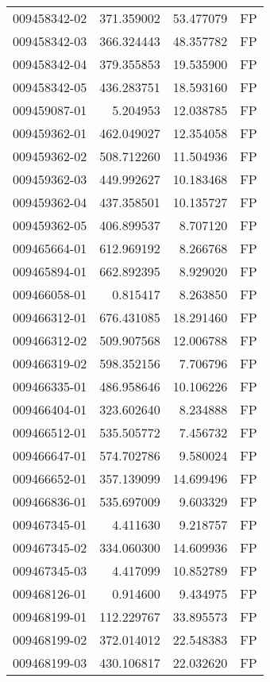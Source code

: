 \begin{tabular}{lrrl}
009458342-02 &  371.359002 &    53.477079 &   FP \\
009458342-03 &  366.324443 &    48.357782 &   FP \\
009458342-04 &  379.355853 &    19.535900 &   FP \\
009458342-05 &  436.283751 &    18.593160 &   FP \\
009459087-01 &    5.204953 &    12.038785 &   FP \\
009459362-01 &  462.049027 &    12.354058 &   FP \\
009459362-02 &  508.712260 &    11.504936 &   FP \\
009459362-03 &  449.992627 &    10.183468 &   FP \\
009459362-04 &  437.358501 &    10.135727 &   FP \\
009459362-05 &  406.899537 &     8.707120 &   FP \\
009465664-01 &  612.969192 &     8.266768 &   FP \\
009465894-01 &  662.892395 &     8.929020 &   FP \\
009466058-01 &    0.815417 &     8.263850 &   FP \\
009466312-01 &  676.431085 &    18.291460 &   FP \\
009466312-02 &  509.907568 &    12.006788 &   FP \\
009466319-02 &  598.352156 &     7.706796 &   FP \\
009466335-01 &  486.958646 &    10.106226 &   FP \\
009466404-01 &  323.602640 &     8.234888 &   FP \\
009466512-01 &  535.505772 &     7.456732 &   FP \\
009466647-01 &  574.702786 &     9.580024 &   FP \\
009466652-01 &  357.139099 &    14.699496 &   FP \\
009466836-01 &  535.697009 &     9.603329 &   FP \\
009467345-01 &    4.411630 &     9.218757 &   FP \\
009467345-02 &  334.060300 &    14.609936 &   FP \\
009467345-03 &    4.417099 &    10.852789 &   FP \\
009468126-01 &    0.914600 &     9.434975 &   FP \\
009468199-01 &  112.229767 &    33.895573 &   FP \\
009468199-02 &  372.014012 &    22.548383 &   FP \\
009468199-03 &  430.106817 &    22.032620 &   FP \\

\end{tabular}
